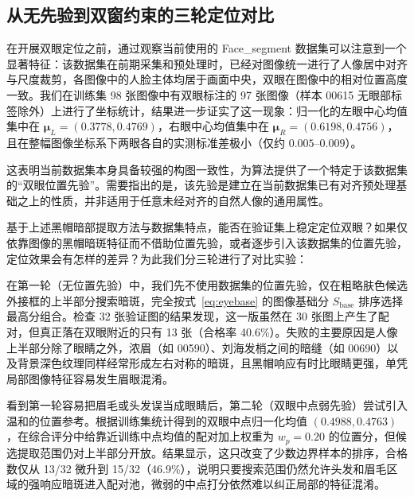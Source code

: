 \subsection{从无先验到双窗约束的三轮定位对比}

在开展双眼定位之前，通过观察当前使用的 Face\_segment 数据集可以注意到一个显著特征：该数据集在前期采集和预处理时，已经对图像统一进行了人像居中对齐与尺度裁剪，各图像中的人脸主体均居于画面中央，双眼在图像中的相对位置高度一致。我们在训练集 98 张图像中有双眼标注的 97 张图像（样本 00615 无眼部标签除外）上进行了坐标统计，结果进一步证实了这一现象：归一化的左眼中心均值集中在 $\boldsymbol{\mu}_L=(0.3778, 0.4769)$，右眼中心均值集中在 $\boldsymbol{\mu}_R=(0.6198, 0.4756)$，且在整幅图像坐标系下两眼各自的实测标准差极小（仅约 $0.005\text{--}0.009$）。

这表明当前数据集本身具备较强的构图一致性，为算法提供了一个特定于该数据集的“双眼位置先验”。需要指出的是，该先验是建立在当前数据集已有对齐预处理基础之上的性质，并非适用于任意未经对齐的自然人像的通用属性。

基于上述黑帽暗部提取方法与数据集特点，能否在验证集上稳定定位双眼？如果仅依靠图像的黑帽暗斑特征而不借助位置先验，或者逐步引入该数据集的位置先验，定位效果会有怎样的差异？为此我们分三轮进行了对比实验：

在第一轮（无位置先验）中，我们先不使用数据集的位置先验，仅在粗略肤色候选外接框的上半部分搜索暗斑，完全按式~\eqref{eq:eyebase} 的图像基础分 $S_{\text{base}}$ 排序选择最高分组合。检查 32 张验证图的结果发现，这一版虽然在 30 张图上产生了配对，但真正落在双眼附近的只有 13 张（合格率 40.6\%）。失败的主要原因是人像上半部分除了眼睛之外，浓眉（如 00590）、刘海发梢之间的暗缝（如 00690）以及背景深色纹理同样经常形成左右对称的暗斑，且黑帽响应有时比眼睛更强，单凭局部图像特征容易发生眉眼混淆。

看到第一轮容易把眉毛或头发误当成眼睛后，第二轮（双眼中点弱先验）尝试引入温和的位置参考。根据训练集统计得到的双眼中点归一化均值 $(0.4988, 0.4763)$，在综合评分中给靠近训练中点均值的配对加上权重为 $w_p=0.20$ 的位置分，但候选提取范围仍对上半部分开放。结果显示，这只改变了少数边界样本的排序，合格数仅从 13/32 微升到 15/32（46.9\%），说明只要搜索范围仍然允许头发和眉毛区域的强响应暗斑进入配对池，微弱的中点打分依然难以纠正局部的特征混淆。

